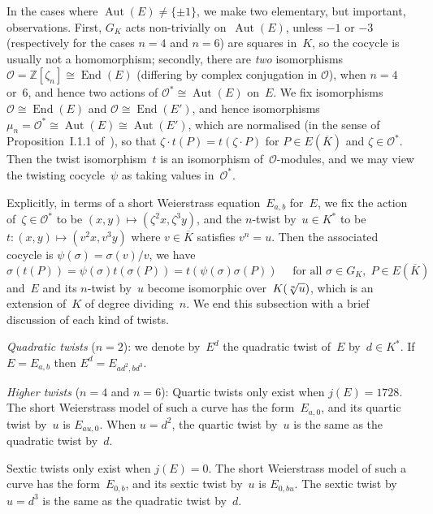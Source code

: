 \documentclass[twoside,leqno,symbols-for-thanks, draft]{rmi}
\numberwithin{equation}{section}
\newcommand{\Z}{\mathbb{Z}}
\newcommand{\Kbar}{{\overline{K}}}
\newcommand{\calO}{\mathcal{O}}
\DeclareMathOperator{\Aut}{Aut}
\DeclareMathOperator{\End}{End}
\theoremstyle{remark}
\begin{document}
In the cases where $\Aut(E)\not=\{\pm1\}$, we make two elementary, but
important, observations. First, $G_K$ acts non-trivially on~$\Aut(E)$,
unless $-1$ or $-3$ (respectively for the cases $n=4$ and $n=6$) are
squares in~$K$, so the cocycle is usually not a homomorphism;
secondly, there are \emph{two} isomorphisms
$\calO=\Z[\zeta_n]\cong\End(E)$ (differing by complex conjugation in
$\calO$), when $n=4$ or~$6$, and hence two actions of
$\calO^*\cong\Aut(E)$ on~$E$.  We fix isomorphisms $\calO\cong\End(E)$
and $\calO\cong\End(E')$, and hence isomorphisms
$\mu_n=\calO^*\cong\Aut(E)\cong\Aut(E')$, which are normalised (in the
sense of Proposition~I.1.1 of~\cite{SilvermanII}), so that $\zeta\cdot
t(P)=t(\zeta\cdot P)$ for $P\in E(\Kbar)$ and $\zeta\in\calO^*$. Then
the twist isomorphism~$t$ is an isomorphism of~$\calO$-modules, and we
may view the twisting cocycle~$\psi$ as taking values in~$\calO^*$.

Explicitly, in terms of a short Weierstrass equation~$E_{a,b}$ for~$E$, we fix
the action of~$\zeta\in\calO^*$ to be
$(x,y)\mapsto(\zeta^2x,\zeta^3y)$, and the $n$-twist by~$u\in K^*$ to be
$t:(x,y)\mapsto(v^2x,v^3y)$ where $v \in \overline{K}$ satisfies $v^n=u$. Then the associated cocycle is
$\psi(\sigma)=\sigma(v)/v$, we have
\begin{equation}\label{E:twist}
  \sigma(t(P)) = \psi(\sigma)t(\sigma(P)) = t(\psi(\sigma)\sigma(P))
   \quad \text{ for all } \sigma \in G_K,
  \; P \in E(\Kbar)
\end{equation}
and~$E$ and its $n$-twist by~$u$ become isomorphic
over~$K(\root n\of u)$, which is an extension of~$K$ of degree
dividing~$n$.
We end this subsection with a brief discussion of each kind of twists.

\emph{Quadratic twists} ($n=2$): we denote by~$E^d$ the quadratic
twist of~$E$ by~$d\in K^*$.  If $E=E_{a,b}$ then $E^d=E_{ad^2,bd^3}$.

\emph{Higher twists} ($n=4$ and $n=6$): Quartic twists only exist when
$j(E)=1728$.  The short Weierstrass model of such a curve has the
form~$E_{a,0}$, and its quartic twist by~$u$ is $E_{au,0}$.  When
$u=d^2$, the quartic twist by~$u$ is the same as the quadratic twist
by~$d$.

Sextic twists only exist when $j(E)=0$.  The short Weierstrass model
of such a curve has the form~$E_{0,b}$, and its sextic twist by~$u$ is
$E_{0,bu}$.  The sextic twist by~$u=d^3$ is the same as the quadratic
twist by~$d$.
\end{document}

